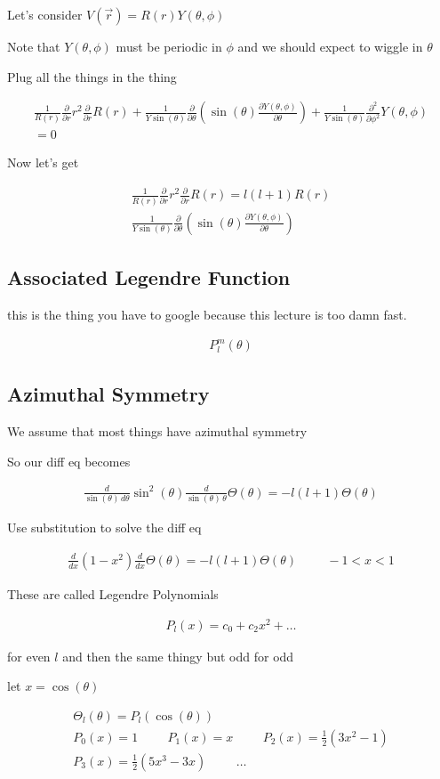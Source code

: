 \documentclass[fleqn]{report}
\newcommand{\hp}{\hspace{1cm}}
\newcommand{\del}{\partial}
\newcommand{\equations} [1] {
\begin{gather*}
#1
\end{gather*}
}
\begin{document}
Let's consider $V(\vec r) = R(r)Y(\theta, \phi)$

Note that $Y(\theta, \phi)$ must be periodic in $\phi$ and we 
should expect to wiggle in $\theta$ 

Plug all the things in the thing 
\equations{
    \frac{1}{R(r)}
    \frac{\del}{\del r}
    r^2
    \frac{\del}{\del r}
    R(r)
    +
    \frac{1}{Y \sin(\theta)}
    \frac{\del}{\del \theta}
    \left(
        \sin(\theta) 
        \frac{\del Y(\theta, \phi)}{\del \theta}
    \right)
    +
    \frac{1}{Y \sin(\theta)}
    \frac{\del^2}{\del \phi^2}
    Y(\theta, \phi)
    \\
    = 0
}

Now let's get 
\equations{
    \frac{1}{R(r)}
    \frac{\del}{\del r}
    r^2
    \frac{\del}{\del r}
    R(r)
    =
    l(l + 1) R(r)
    \\
    \frac{1}{Y \sin(\theta)}
    \frac{\del}{\del \theta}
    \left(
        \sin(\theta) 
        \frac{\del Y(\theta, \phi)}{\del \theta}
    \right)
}

\subsection{Associated Legendre Function}
this is the thing you have to google because this lecture is too damn fast. 

\equations{
    P^m_l (\theta)
}


\subsection{Azimuthal Symmetry}

We assume that most things have azimuthal symmetry 

So our diff eq becomes 
\equations{
    \frac{d}{\sin(\theta) \, d \theta}
    \sin^2(\theta)
    \frac{d}{\sin(\theta) \, \theta}
    \Theta(\theta)
    =
    -l(l + 1)
    \Theta(\theta)
}

Use substitution to solve the diff eq 
\equations{
    \frac{d}{dx} (1 - x^2) \frac{d}{dx} \Theta(\theta)
    =
    -l(l + 1) \Theta(\theta)
    \hp 
    -1 < x < 1
}
These are called Legendre Polynomials 
\equations{
    P_l(x) = 
    c_0 + c_2x^2 + \ldots 
}
for even $l$ and then the same thingy but odd for odd 

let $x = \cos(\theta)$
\equations{
    \Theta_l(\theta) = P_l(\cos(\theta))
    \\
    P_0(x) = 1
    \hp 
    P_1(x) = x
    \hp 
    P_2(x) = \frac{1}{2} (3x^2 - 1)
    \\
    P_3(x) = \frac{1}{2} (5x^3 - 3x)
    \hp 
    \ldots 
}
\end{document}
